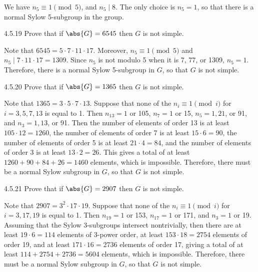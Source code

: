 \begin{sol}
	We have $n_5 \equiv 1 \pmod 5$, and $n_5 \mid 8$.
	The only choice is $n_5 = 1$, so that there is a normal Sylow 5-subgroup in the group.
\end{sol}

\begin{exercise}{4.5.19}
	Prove that if $\abs{G} = 6545$ then $G$ is not simple.
\end{exercise}

\begin{sol}
	Note that $6545 = 5 \cdot 7 \cdot 11 \cdot 17$.
	Moreover, $n_5 \equiv 1 \pmod 5$ and $n_5 \mid 7 \cdot 11 \cdot 17 = 1309$.
	Since $n_5$ is not modulo 5 when it is 7, 77, or 1309, $n_5 = 1$.
	Therefore, there is a normal Sylow 5-subgroup in $G$, so that $G$ is not simple.
\end{sol}

\begin{exercise}{4.5.20}
	Prove that if $\abs{G} = 1365$ then $G$ is not simple.
\end{exercise}

\begin{sol}
	Note that $1365 = 3 \cdot 5 \cdot 7 \cdot 13$.
	Suppose that none of the $n_i \equiv 1 \pmod i$ for $i = 3, 5, 7, 13$ is equal to 1.
	Then $n_{13} = 1$ or 105, $n_7 = 1$ or 15, $n_5 = 1, 21$, or 91, and $n_3 = 1, 13$, or 91.
	Then the number of elements of order 13 is at least $105 \cdot 12 = 1260$, the number of elements of order 7 is at least $15 \cdot 6 = 90$, the number of elements of order 5 is at least $21 \cdot 4 = 84$, and the number of elements of order 3 is at least $13 \cdot 2 = 26$.
	This gives a total of at least $1260 + 90 + 84 + 26 = 1460$ elements, which is impossible.
	Therefore, there must be a normal Sylow subgroup in $G$, so that $G$ is not simple.
\end{sol}

\begin{exercise}{4.5.21}
	Prove that if $\abs{G} = 2907$ then $G$ is not simple.
\end{exercise}

\begin{sol}
	Note that $2907 = 3^2 \cdot 17 \cdot 19$.
	Suppose that none of the $n_i \equiv 1 \pmod i$ for $i = 3, 17, 19$ is equal to 1.
	Then $n_{19} = 1$ or 153, $n_{17} = 1$ or 171, and $n_3 = 1$ or 19.
	Assuming that the Sylow 3-subgroups intersect nontrivially, then there are at least $19 \cdot 6 = 114$ elements of 3-power order, at least $153 \cdot 18 = 2754$ elements of order 19, and at least $171 \cdot 16 = 2736$ elements of order 17, giving a total of at least $114 + 2754 + 2736 = 5604$ elements, which is impossible.
	Therefore, there must be a normal Sylow subgroup in $G$, so that $G$ is not simple.
\end{sol}

